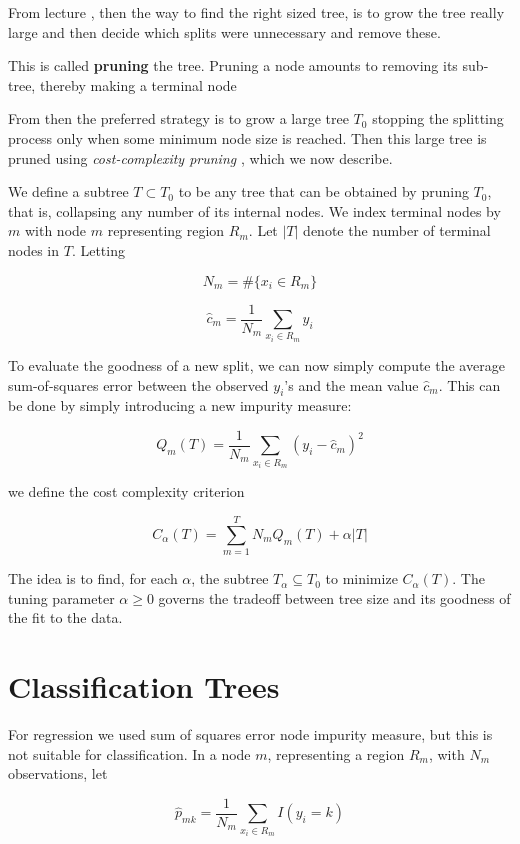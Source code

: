 From lecture \cite[p.~31]{lecture8}, then the way to find the right sized tree, is to grow the tree really large and then decide which splits were unnecessary and remove these.

This is called \textbf{pruning} the tree. Pruning a node amounts to removing its sub-tree, thereby making a terminal node

From \cite[p.~308]{friedman2016elements} then the preferred strategy is to grow a large tree $T_0$ stopping the splitting process only when some minimum node size is reached. Then this large tree is pruned using \textit{cost-complexity pruning} , which we now describe.

We define a subtree $T \subset T_0$ to be any tree that can be obtained by pruning $T_0$, that is, collapsing any number of its internal nodes. We index terminal nodes by $m$ with node $m$ representing region $R_m$. Let $|T|$ denote the number of terminal nodes in $T$. Letting

\[
    N_m = \# \{x_i \in R_m\}
\]

\[
    \hat{c}_m = \frac{1}{N_m} \sum_{x_i \in R_m} y_i
\]

To evaluate the goodness of a new split, we can now simply compute the average sum-of-squares error between the observed $y_i$'s and the mean value $\hat{c}_m$. This can be done by simply introducing a new impurity measure:

\[
    Q_m (T) = \frac{1}{N_m} \sum_{x_i \in R_m}  (y_i - \hat{c}_m)^2
\]

we define the cost complexity criterion

\[
    C_\alpha (T) = \sum_{m=1}^{T} N_m Q_m (T) + \alpha |T|
\]

The idea is to find, for each $\alpha$, the subtree $T_\alpha \subseteq T_0$ to minimize $C_\alpha (T)$.
The tuning parameter $\alpha \geq 0$ governs the tradeoff between tree size and its goodness of the fit to the data.  \cite[p.~308]{friedman2016elements}

\section{Classification Trees}

For regression we used sum of squares error node impurity measure, but this is not suitable for classification. In a node $m$, representing a region $R_m$, with $N_m$ observations, let

\[
    \hat{p}_{mk} = \frac{1}{N_m} \sum_{x_i \in R_m} I ( y_i = k)
\]


